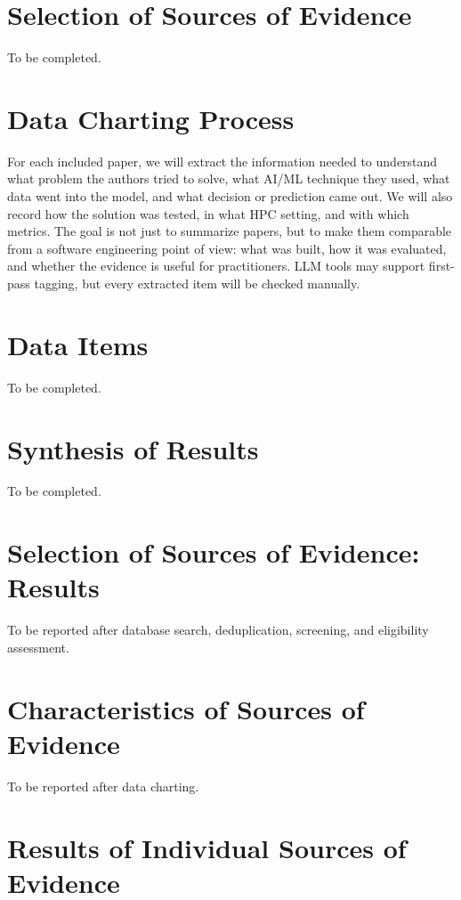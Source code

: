 \documentclass[journal]{IEEEtran}
\begin{document}
\section{Selection of Sources of Evidence}

To be completed.

\section{Data Charting Process}

For each included paper, we will extract the information needed to understand what problem the authors tried to solve, what AI/ML technique they used, what data went into the model, and what decision or prediction came out. We will also record how the solution was tested, in what HPC setting, and with which metrics. The goal is not just to summarize papers, but to make them comparable from a software engineering point of view: what was built, how it was evaluated, and whether the evidence is useful for practitioners. LLM tools may support first-pass tagging, but every extracted item will be checked manually.

\section{Data Items}

To be completed.

\section{Synthesis of Results}

To be completed.

\section{Selection of Sources of Evidence: Results}

To be reported after database search, deduplication, screening, and eligibility assessment.

\section{Characteristics of Sources of Evidence}

To be reported after data charting.

\section{Results of Individual Sources of Evidence}
\end{document}

